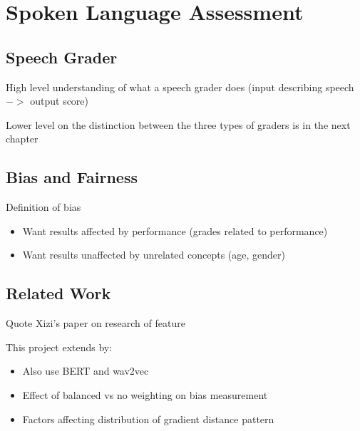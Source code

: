 \chapter{Spoken Language Assessment} \label{chap:assessment}

\section{Speech Grader}
High level understanding of what a speech grader does (input describing speech $->$ output score)

Lower level on the distinction between the three types of graders is in the next chapter

\section{Bias and Fairness}

Definition of bias
\begin{itemize}
    \item Want results affected by performance (grades related to performance)
    \item Want results unaffected by unrelated concepts (age, gender)
\end{itemize}

\section{Related Work}

Quote Xizi's paper on research of feature

This project extends by:

\begin{itemize}
    \item Also use BERT and wav2vec
    \item Effect of balanced vs no weighting on bias measurement
    \item Factors affecting distribution of gradient distance pattern
\end{itemize}
